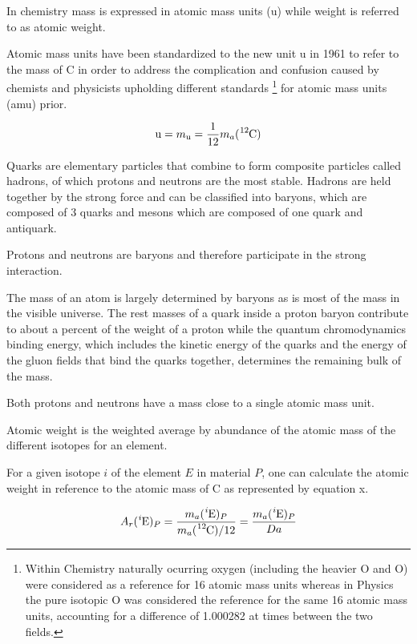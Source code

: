 In chemistry mass is expressed in atomic mass units (\si{\atomicmassunit})
while weight is referred to as atomic weight.

Atomic mass units have been standardized to the new
unit \si{\atomicmassunit} in 1961 to refer to the mass of C in order
to address the complication and confusion caused by chemists and physicists
upholding different standards
\footnote{Within Chemistry naturally ocurring oxygen (including the heavier
O and O) were considered as a reference for 16 atomic mass
units whereas in Physics the pure isotopic O was considered the
reference for the same 16 atomic mass units, accounting for a difference of
\num{1.000282} at times between the two fields.} for atomic mass units (amu)
prior.

$$\mathrm {u} =m_{\mathrm {u} }={\frac {1}{12}} m_a(\mathrm{ \ce{^{12}}C })$$

Quarks are elementary particles that combine to form composite particles called
hadrons, of which protons and neutrons are the most stable. Hadrons are held
together by the strong force and can be classified into baryons, which are
composed of 3 quarks and mesons which are composed of one quark and antiquark.

Protons and neutrons are baryons and therefore participate in the strong
interaction.

The mass of an atom is largely determined by baryons as is most of the mass
in the visible universe. The rest masses of a quark inside a proton baryon
contribute to about a percent of the weight of a proton while the quantum
chromodynamics binding energy, which includes the kinetic energy of the quarks
and the energy of the gluon fields that bind the quarks together, determines
the remaining bulk of the mass.

Both protons and neutrons have a mass close to a single atomic mass unit.


Atomic weight is the weighted average by abundance of the atomic mass of the
different isotopes for an element.

For a given isotope $i$ of the element $E$ in material $P$, one can calculate
the atomic weight in reference to the atomic mass of C as
represented by equation x.

$$A_r(\mathrm { \ce{^i}E })_P = \frac{m_a(\mathrm { \ce{^i}E })_P}{m_a(\mathrm { \ce{^{12}}C })/12} = \frac{m_a(\mathrm { \ce{^i}E })_P}{Da}$$

